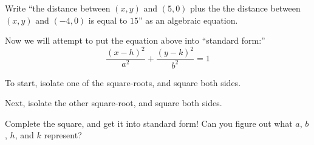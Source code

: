 \begin{prob} 
Write ``the distance between $(x,y)$ and $(5,0)$ plus the the distance
between $(x,y)$ and $(-4,0)$ is equal to $15$'' as an algebraic
equation.
\end{prob}

Now we will attempt to put the equation above into ``standard form:''
\[
\frac{(x-h)^2}{a^2} + \frac{(y-k)^2}{b^2} = 1
\]

\begin{prob}
To start, isolate one of the square-roots, and square both sides.
\end{prob}

\begin{prob}
Next, isolate the other square-root, and square both sides. 
\end{prob}

\begin{prob}
Complete the square, and get it into standard form! Can you figure out what $a$, $b$, $h$, and $k$ represent?
\end{prob}

